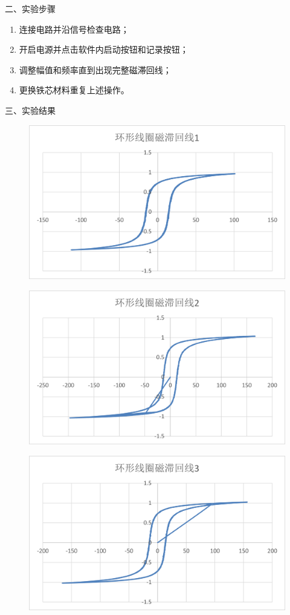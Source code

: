 \documentclass[dvipsnames, svgnames,a4paper,11pt]{article}
\begin{document}
二、实验步骤

\begin{enumerate}
	\item 连接电路并沿信号检查电路；
	\item 开启电源并点击软件内启动按钮和记录按钮；
	\item 调整幅值和频率直到出现完整磁滞回线；
	\item 更换铁芯材料重复上述操作。
\end{enumerate}

三、实验结果
\begin{figure}[htbp]
	\includegraphics{磁滞回线/图片1.png}
\end{figure}
\begin{figure}[htbp]
	\includegraphics{磁滞回线/图片2.png}
\end{figure}
\begin{figure}[htbp]
	\includegraphics{磁滞回线/图片3.png}
\end{figure}
\end{document}
